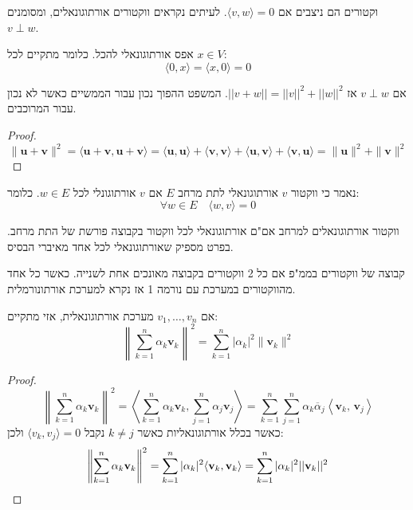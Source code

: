 \documentclass{tstextbook}
\begin{document}
\begin{definition}
וקטורים הם ניצבים אם \(\langle v, w \rangle = 0\). לעיתים נקראים ווקטורים אורתוגונאלים, ומסומנים \(v\perp w\).

\end{definition}
\begin{proposition}
אפס אורתוגונאלי להכל. כלומר מתקיים לכל \(x \in V\):
$$\langle 0,x \rangle =\langle x,0 \rangle =0$$

\end{proposition}
\begin{theorem}[פתגורס]
אם \(v\perp w\) אז \(||v+w|| = ||v||^2 + ||w||^2\). המשפט ההפוך נכון עבור הממשיים כאשר לא נכון עבור המרוכבים.

\end{theorem}
\begin{proof}
$$\|\mathbf{u}+\mathbf{v}\|^{2}=\langle\mathbf{u}+\mathbf{v},\mathbf{u}+\mathbf{v}\rangle=\langle\mathbf{u},\mathbf{u}\rangle+\langle\mathbf{v},\mathbf{v}\rangle+\langle\mathbf{u},\mathbf{v}\rangle+\langle\mathbf{v},\mathbf{u}\rangle=\|\mathbf{u}\|^{2}+\|\mathbf{v}\|^{2}$$

\end{proof}
\begin{definition}
נאמר כי ווקטור \(v\) אורתוגונאלי לתת מרחב \(E\) אם \(v\) אורתוגונלי לכל \(w \in E\). כלומר:
$$\forall w \in E\quad \langle w,v \rangle =0$$

\end{definition}
\begin{proposition}
ווקטור אורתוגונאלים למרחב אם"ם אורתוגונאלי לכל ווקטור בקבוצה פורשת של התת מרחב. בפרט מספיק שאורתוגונאלי לכל אחד מאיברי הבסיס.

\end{proposition}
\begin{definition}
קבוצה של ווקטורים בממ"פ אם כל 2 ווקטורים בקבוצה מאונכים אחת לשנייה. כאשר כל אחד מהווקטורים במערכת עם נורמה 1 אז נקרא למערכת אורתונורמלית.

\end{definition}
\begin{theorem}
אם \(v_{1},\dots,v_{n}\) מערכת אורתוגונאלית, אזי מתקיים:
$$\left\|\sum_{k=1}^{n}\alpha_{k}\mathbf{v}_{k}\right\|^{2}=\sum_{k=1}^{n}|\alpha_{k}|^{2}\|\mathbf{v}_{k}\|^{2}$$

\end{theorem}
\begin{proof}
$$\left\|\sum_{k=1}^{n}\alpha_{k}\mathbf{v}_{k}\right\|^{2}=\left\langle   \sum_{k=1}^{n}\alpha_{k}\mathbf{v}_{k},\sum_{j=1}^{n}\alpha_{j}\mathbf{v}_{j}\right\rangle=\sum_{k=1}^{n}\sum_{j=1}^{n}\alpha_{k}{\overline{{\alpha}}}_{j}\left\langle \mathbf{v}_{k},\,\mathbf{v}_{j} \right\rangle$$
כאשר בכלל אורתוגונאליות כאשר \(k\neq j\) נקבל \(\langle v_{k},v_{j} \rangle=0\) ולכן:
$$\left\|\sum_{k=1}^{n}\alpha_{k}\mathbf{v}_{k}\right\|^{2} = \sum_{k=1}^{n}|\alpha_{k}|^{2}\langle{\bf v}_{k},{\bf v}_{k}\rangle=\sum_{k=1}^{n}|\alpha_{k}|^{2}||{\bf v}_{k}||^{2}$$

\end{proof}
\end{document}

